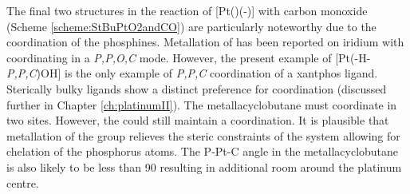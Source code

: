 The final two structures in the reaction of [Pt(\tButhixantphos)(-)] with carbon monoxide (Scheme \ref{scheme:StBuPtO2andCO}) are particularly noteworthy due to the \cis{} coordination of the phosphines.  Metallation of \iPrxantphos{} has been reported on iridium\cite{Esteruelas2013} with \iPrxantphos{} coordinating in a \dento{}\emph{P,P\textprime,O,C} mode.  However, the present example of [Pt(\tButhixantphos-H-\dento{}\emph{P,P\textprime,C})OH] is the only example of \dento{}\emph{P,P\textprime,C} coordination of a xantphos ligand.  Sterically bulky ligands show a distinct preference for \trans{} coordination (discussed further in Chapter \ref{ch:platinumII}).  The metallacyclobutane must coordinate in two \cis{} sites. However, the \tBuxantphos{} could still maintain a \trans{} coordination.  It is plausible that metallation of the \tBu{} group relieves the steric constraints of the system allowing for \cis{} chelation of the phosphorus atoms.  The P-Pt-C angle in the metallacyclobutane is also likely to be less than 90\degrees{} resulting in additional room around the platinum centre.  


